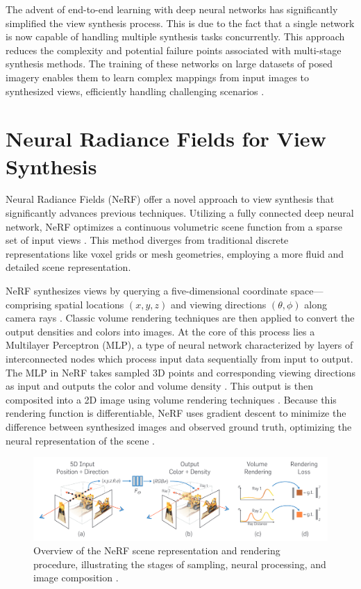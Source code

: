 The advent of end-to-end learning with deep neural networks has significantly simplified the view synthesis process. This is due to the fact that a single network is now capable of handling multiple synthesis tasks concurrently.
This approach reduces the complexity and potential failure points associated with multi-stage synthesis methods.
The training of these networks on large datasets of posed imagery enables them to learn complex mappings from input images to synthesized views, efficiently handling challenging scenarios \cite{chen_photographic_2017,flynn_deep_2016}.

\section{Neural Radiance Fields for View Synthesis}

Neural Radiance Fields (NeRF) offer a novel approach to view synthesis that significantly advances previous techniques.
Utilizing a fully connected deep neural network, NeRF optimizes a continuous volumetric scene function from a sparse set of input views \cite{mildenhall_nerf_2021}.
This method diverges from traditional discrete representations like voxel grids or mesh geometries, employing a more fluid and detailed scene representation.

NeRF synthesizes views by querying a five-dimensional coordinate space—comprising spatial locations \((x, y, z)\) and viewing directions \((\theta, \phi)\) along camera rays .
Classic volume rendering techniques are then applied to convert the output densities and colors into images.
At the core of this process lies a Multilayer Perceptron (MLP), a type of neural network characterized by layers of interconnected nodes which process input data sequentially from input to output.
The MLP in NeRF takes sampled 3D points and corresponding viewing directions as input and outputs the color and volume density  .
This output is then composited into a 2D image using volume rendering techniques  .
Because this rendering function is differentiable, NeRF uses gradient descent to minimize the difference between synthesized images and observed ground truth, optimizing the neural representation of the scene  .

\begin{figure}[h!]
  \centering
  \includegraphics[width=\textwidth]{figures/bg-nerf.png}
  \caption{Overview of the NeRF scene representation and rendering procedure, illustrating the stages of sampling, neural processing, and image composition \cite{mildenhall_nerf_2021}.}
  \label{fig:nerf-overview}
\end{figure}

